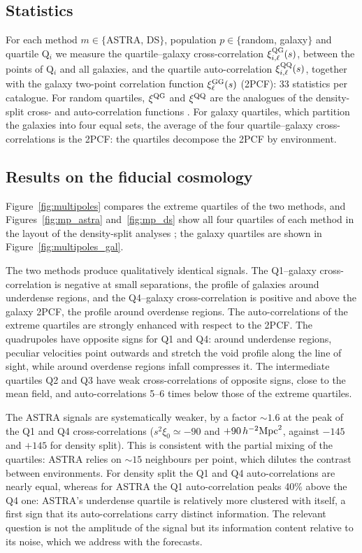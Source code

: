 \documentclass[11pt,twocolumn]{article}
\begin{document}
\subsection{Statistics}

For each method $m\in\{$ASTRA, DS$\}$, population $p\in\{$random, galaxy$\}$ and quartile Q$_i$ we measure the quartile--galaxy cross-correlation $\xi^{\rm QG}_{i,\ell}(s)$, between the points of Q$_i$ and all galaxies, and the quartile auto-correlation $\xi^{\rm QQ}_{i,\ell}(s)$, together with the galaxy two-point correlation function $\xi^{\rm GG}_\ell(s)$ (2PCF): 33 statistics per catalogue. For random quartiles, $\xi^{\rm QG}$ and $\xi^{\rm QQ}$ are the analogues of the density-split cross- and auto-correlation functions \cite{Paillas2023}. For galaxy quartiles, which partition the galaxies into four equal sets, the average of the four quartile--galaxy cross-correlations is the 2PCF: the quartiles decompose the 2PCF by environment.

\subsection{Results on the fiducial cosmology}

Figure~\ref{fig:multipoles} compares the extreme quartiles of the two methods, and Figures~\ref{fig:mp_astra} and~\ref{fig:mp_ds} show all four quartiles of each method in the layout of the density-split analyses \cite{Paillas2023}; the galaxy quartiles are shown in Figure~\ref{fig:multipoles_gal}.

The two methods produce qualitatively identical signals. The Q1--galaxy cross-correlation is negative at small separations, the profile of galaxies around underdense regions, and the Q4--galaxy cross-correlation is positive and above the galaxy 2PCF, the profile around overdense regions. The auto-correlations of the extreme quartiles are strongly enhanced with respect to the 2PCF. The quadrupoles have opposite signs for Q1 and Q4: around underdense regions, peculiar velocities point outwards and stretch the void profile along the line of sight, while around overdense regions infall compresses it. The intermediate quartiles Q2 and Q3 have weak cross-correlations of opposite signs, close to the mean field, and auto-correlations 5--6 times below those of the extreme quartiles.

The ASTRA signals are systematically weaker, by a factor $\sim1.6$ at the peak of the Q1 and Q4 cross-correlations ($s^2\xi_0\simeq-90$ and $+90\,h^{-2}{\rm Mpc}^2$, against $-145$ and $+145$ for density split). This is consistent with the partial mixing of the quartiles: ASTRA relies on $\sim15$ neighbours per point, which dilutes the contrast between environments. For density split the Q1 and Q4 auto-correlations are nearly equal, whereas for ASTRA the Q1 auto-correlation peaks 40\% above the Q4 one: ASTRA's underdense quartile is relatively more clustered with itself, a first sign that its auto-correlations carry distinct information. The relevant question is not the amplitude of the signal but its information content relative to its noise, which we address with the forecasts.
\end{document}
